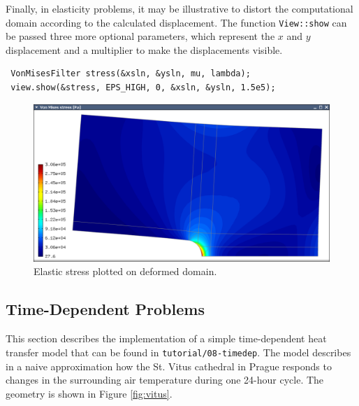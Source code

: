 \documentclass[11pt]{article}
\begin{document}
Finally, in elasticity problems, it may be illustrative to distort the computational
domain according to the calculated displacement. The function \verb"View::show" can be
passed three more optional parameters, which represent the $x$ and $y$ displacement
and a multiplier to make the displacements visible.
\begin{lstlisting}
 VonMisesFilter stress(&xsln, &ysln, mu, lambda);
 view.show(&stress, EPS_HIGH, 0, &xsln, &ysln, 1.5e5);
\end{lstlisting}


\clearpage

\begin{figure}[!ht]
  \medskip \centering
  \includegraphics[width=\textwidth]{img/mises.png}
  \caption{Elastic stress plotted on deformed domain.}
  \label{elastsln}
\end{figure}



\subsection{Time-Dependent Problems}

This section describes the implementation of a simple time-dependent
heat transfer model that can be found in {\tt tutorial/08-timedep}.
The model describes in a naive approximation how the St. Vitus cathedral
in Prague responds to changes in the surrounding air temperature
during one 24-hour cycle. The geometry is shown in Figure \ref{fig:vitus}.
\end{document}
